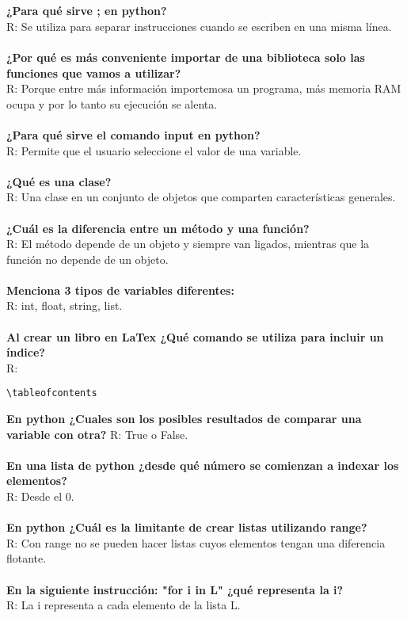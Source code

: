 \documentclass[letter paper, 12pt, oneside]{article}
\begin{document}
\\\\
\textbf{¿Para qué sirve ; en python?}
\\
R: Se utiliza para separar instrucciones cuando se escriben en una misma línea. 
\\\\
\textbf{¿Por qué es más conveniente importar de una biblioteca solo las funciones que vamos a utilizar?}
\\
R: Porque entre más información importemosa un programa, más memoria RAM ocupa y por lo tanto su ejecución se alenta. 
\\\\
\textbf{¿Para qué sirve el comando input en python?}
\\
R: Permite que el usuario seleccione el valor de una variable. 
\\\\
\textbf{¿Qué es una clase?}
\\
R: Una clase en un conjunto de objetos que comparten características generales.
\\\\
\textbf{¿Cuál es la diferencia entre un método y una función?}
\\
R: El método depende de un objeto y siempre van ligados, mientras que la función no depende de un objeto. 
\\\\
\textbf{Menciona 3 tipos de variables diferentes:}
\\
R: int, float, string, list.
\\\\
\textbf{Al crear un libro en LaTex ¿Qué comando se utiliza para incluir un índice?}
\\
R: \begin{verbatim}
\tableofcontents
\end{verbatim}
\textbf{En python ¿Cuales son los posibles resultados de comparar una variable con otra?}
R: True o False. 
\\\\
\textbf{En una lista de python ¿desde qué número se comienzan a indexar los elementos?}
\\
R: Desde el 0. 
\\\\
\textbf{En python ¿Cuál es la limitante de crear listas utilizando range?}
\\
R: Con range no se pueden hacer listas cuyos elementos tengan una diferencia flotante. 
\\\\
\textbf{En la siguiente instrucción: "for i in L" ¿qué representa la i?}
\\
R: La i representa a cada elemento de la lista L.
\end{document}
